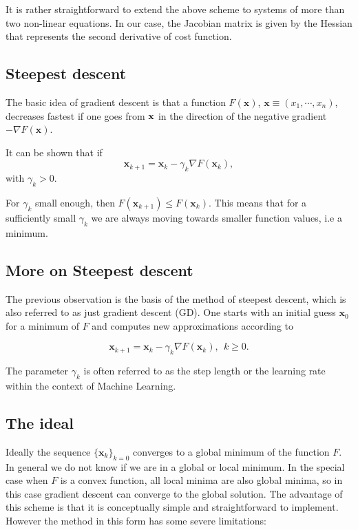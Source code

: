 \documentclass[%
oneside,                 %
final,                   %
10pt]{article}
\begin{document}
It is rather straightforward to extend the above scheme to systems of
more than two non-linear equations. In our case, the Jacobian matrix is given by the Hessian that represents the second derivative of cost function. 



\subsection{Steepest descent}

The basic idea of gradient descent is
that a function $F(\mathbf{x})$, 
$\mathbf{x} \equiv (x_1,\cdots,x_n)$, decreases fastest if one goes from $\bf {x}$ in the
direction of the negative gradient $-\nabla F(\mathbf{x})$.

It can be shown that if 
\[
\mathbf{x}_{k+1} = \mathbf{x}_k - \gamma_k \nabla F(\mathbf{x}_k),
\]
with $\gamma_k > 0$.

For $\gamma_k$ small enough, then $F(\mathbf{x}_{k+1}) \leq
F(\mathbf{x}_k)$. This means that for a sufficiently small $\gamma_k$
we are always moving towards smaller function values, i.e a minimum.

\subsection{More on Steepest descent}

The previous observation is the basis of the method of steepest
descent, which is also referred to as just gradient descent (GD). One
starts with an initial guess $\mathbf{x}_0$ for a minimum of $F$ and
computes new approximations according to

\[
\mathbf{x}_{k+1} = \mathbf{x}_k - \gamma_k \nabla F(\mathbf{x}_k), \ \ k \geq 0.
\]

The parameter $\gamma_k$ is often referred to as the step length or
the learning rate within the context of Machine Learning.

\subsection{The ideal}

Ideally the sequence $\{\mathbf{x}_k \}_{k=0}$ converges to a global
minimum of the function $F$. In general we do not know if we are in a
global or local minimum. In the special case when $F$ is a convex
function, all local minima are also global minima, so in this case
gradient descent can converge to the global solution. The advantage of
this scheme is that it is conceptually simple and straightforward to
implement. However the method in this form has some severe
limitations:
\end{document}

